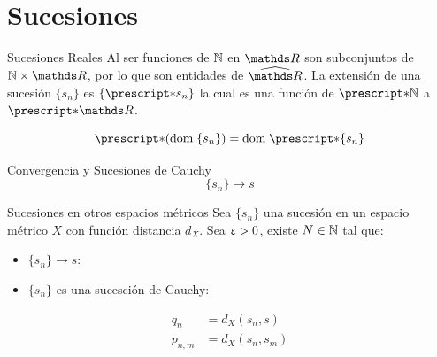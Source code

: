 \documentclass{beamer}
\begin{document}
\section{Sucesiones}
\begin{frame}{Sucesiones Reales}
  Al ser funciones de $\mathbb{N}$ en $\R$ son subconjuntos de $\N\times\R$, por
  lo que son entidades de $\Rh$. La extensión de una sucesión $\{s_n\}$
  es $\{\st{s_n}\}$ la cual es una función de $\st{\N}$ a $\st{\R}$.

  \[\st{(\dom \{s_n\})} = \dom \st{\{s_n\}}\]
\end{frame}
\begin{frame}{Convergencia y Sucesiones de Cauchy}
  \[\{s_n\} \to s\]
\end{frame}
\begin{frame}{Sucesiones en otros espacios métricos}
  Sea $\{s_n\}$ una sucesión en un espacio métrico $X$ con función
  distancia $d_X$.
  Sea $\upvarepsilon>0$, existe $N\in\mathbb{N}$ tal que:
  \begin{itemize}
    \item $\{s_n\} \to s$:
    \item $\{s_n\}$ es una sucesción de Cauchy:
  \end{itemize}
  \pause
  \begin{align*}
    q_n &= d_X(s_n,s)\\
    p_{n,m} &= d_X(s_n,s_m)
  \end{align*}
\end{frame}
\end{document}
